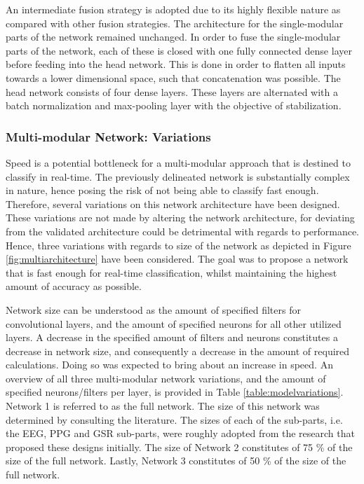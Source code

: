 \documentclass[12pt]{article}
\begin{document}
An intermediate fusion strategy is adopted due to its highly flexible nature as compared with other fusion strategies. The architecture for the single-modular parts of the network remained unchanged. In order to fuse the  single-modular parts of the network, each of these is closed with one fully connected dense layer before feeding into the head network. This is done in order to flatten all inputs towards a lower dimensional space, such that concatenation was possible. The head network consists of four dense layers. These layers are alternated with a batch normalization and max-pooling layer with the objective of stabilization. 

\subsubsection{Multi-modular Network: Variations}
Speed is a potential bottleneck for a multi-modular approach that is destined to classify in real-time. The previously delineated network is substantially complex in nature, hence posing the risk of not being able to classify fast enough. Therefore, several variations on this network architecture have been designed. These variations are not made by altering the network architecture, for deviating from the validated architecture could be detrimental with regards to performance. Hence, three variations with regards to size of the network as depicted in Figure \ref{fig:multiarchitecture} have been considered. The goal was to propose a network that is fast enough for real-time classification, whilst maintaining the highest amount of accuracy as possible. 

Network size can be understood as the amount of specified filters for convolutional layers, and the amount of specified neurons for all other utilized layers. A decrease in the specified amount of filters and neurons constitutes a decrease in network size, and consequently a decrease in the amount of required calculations. Doing so was expected to bring about an increase in speed. An overview of all three multi-modular network variations, and the amount of specified neurons/filters per layer, is provided in Table \ref{table:modelvariations}. Network 1 is referred to as the full network. The size of this network was determined by consulting the literature. The sizes of each of the sub-parts, i.e. the EEG, PPG and GSR sub-parts, were roughly adopted from the research that proposed these designs initially. The size of Network 2 constitutes of 75 \% of the size of the full network. Lastly, Network 3 constitutes of 50 \% of the size of the full network.
\end{document}
